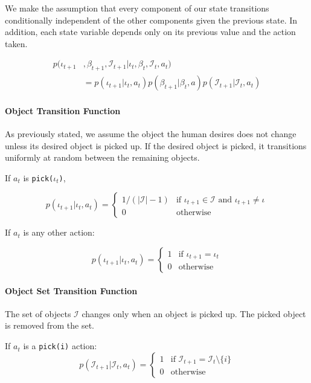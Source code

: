 \documentclass[conference]{IEEEtran}
\newcommand{\Iota}{\mathcal{I}}
\begin{document}
We make the assumption that every component of our state transitions conditionally independent of the other components given the previous state. In addition, each state variable depends only on its previous value and the action taken. 

\begin{align*}
	p(\iota_{t+1}&, \beta_{t+1}, \Iota_{t+1} | \iota_t, \beta_t, \Iota_t, a_t) \\
	&=  p(\iota_{t+1} | \iota_t, a_t) p(\beta_{t+1} | \beta_t, a) p(\Iota_{t+1} | \Iota_t, a_t)
\end{align*}

\paragraph{Object Transition Function}
As previously stated, we assume the object the human desires does not change unless its desired object is picked up. If the desired object is picked, it transitions uniformly at random between the remaining objects. 

If $a_t$ is \texttt{pick($\iota_t$)}, 

\begin{equation*}
	p(\iota_{t+1} | \iota_t, a_t) = \begin{cases}
		1/(|\Iota|-1) & \text{if } \iota_{t+1} \in \Iota \text{ and } \iota_{t+1} \ne \iota \\
		0 & \text{otherwise} 
	\end{cases}
\end{equation*}


If $a_t$ is any other action: 

\begin{equation*}
	p(\iota_{t+1} | \iota_t, a_t) = \begin{cases} 
		1 & \text{if $\iota_{t+1} = \iota_t$} \\
		0 & \text{otherwise}
	\end{cases}
\end{equation*}

\paragraph{Object Set Transition Function}

The set of objects $\Iota$ changes only when an object is picked up. The picked object is removed from the set. 

If $a_t$ is a \texttt{pick(i)} action: 
\begin{equation*}
	p(\Iota_{t+1} | \Iota_t, a_t) = \begin{cases}
		1 & \text{if $\Iota_{t+1} = \Iota_t \setminus \{i\}$} \\ 
		0 & \text{otherwise}
	\end{cases}
\end{equation*}
\end{document}
